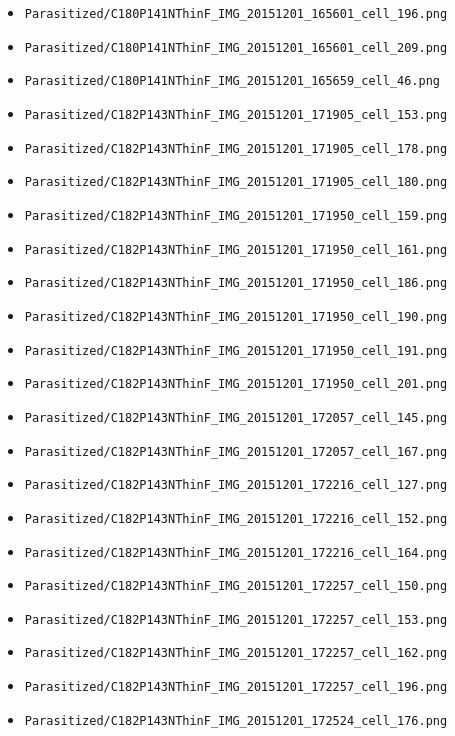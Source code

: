 \begin{itemize}
\item \texttt{Parasitized/C180P141NThinF\_IMG\_20151201\_165601\_cell\_196.png}
\item \texttt{Parasitized/C180P141NThinF\_IMG\_20151201\_165601\_cell\_209.png}
\item \texttt{Parasitized/C180P141NThinF\_IMG\_20151201\_165659\_cell\_46.png}
\item \texttt{Parasitized/C182P143NThinF\_IMG\_20151201\_171905\_cell\_153.png}
\item \texttt{Parasitized/C182P143NThinF\_IMG\_20151201\_171905\_cell\_178.png}
\item \texttt{Parasitized/C182P143NThinF\_IMG\_20151201\_171905\_cell\_180.png}
\item \texttt{Parasitized/C182P143NThinF\_IMG\_20151201\_171950\_cell\_159.png}
\item \texttt{Parasitized/C182P143NThinF\_IMG\_20151201\_171950\_cell\_161.png}
\item \texttt{Parasitized/C182P143NThinF\_IMG\_20151201\_171950\_cell\_186.png}
\item \texttt{Parasitized/C182P143NThinF\_IMG\_20151201\_171950\_cell\_190.png}
\item \texttt{Parasitized/C182P143NThinF\_IMG\_20151201\_171950\_cell\_191.png}
\item \texttt{Parasitized/C182P143NThinF\_IMG\_20151201\_171950\_cell\_201.png}
\item \texttt{Parasitized/C182P143NThinF\_IMG\_20151201\_172057\_cell\_145.png}
\item \texttt{Parasitized/C182P143NThinF\_IMG\_20151201\_172057\_cell\_167.png}
\item \texttt{Parasitized/C182P143NThinF\_IMG\_20151201\_172216\_cell\_127.png}
\item \texttt{Parasitized/C182P143NThinF\_IMG\_20151201\_172216\_cell\_152.png}
\item \texttt{Parasitized/C182P143NThinF\_IMG\_20151201\_172216\_cell\_164.png}
\item \texttt{Parasitized/C182P143NThinF\_IMG\_20151201\_172257\_cell\_150.png}
\item \texttt{Parasitized/C182P143NThinF\_IMG\_20151201\_172257\_cell\_153.png}
\item \texttt{Parasitized/C182P143NThinF\_IMG\_20151201\_172257\_cell\_162.png}
\item \texttt{Parasitized/C182P143NThinF\_IMG\_20151201\_172257\_cell\_196.png}
\item \texttt{Parasitized/C182P143NThinF\_IMG\_20151201\_172524\_cell\_176.png}

\end{itemize}
